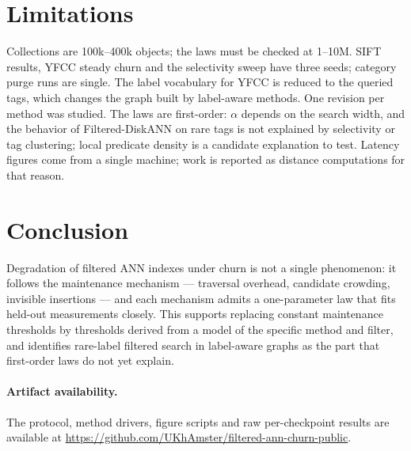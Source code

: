 \documentclass[10pt,a4paper]{article}
\begin{document}
\section{Limitations}

Collections are 100k--400k objects; the laws must be checked at 1--10M. SIFT results, YFCC steady churn and the selectivity sweep have three seeds; category purge runs are single. The label vocabulary for YFCC is reduced to the queried tags, which changes the graph built by label-aware methods. One revision per method was studied. The laws are first-order: $\alpha$ depends on the search width, and the behavior of Filtered-DiskANN on rare tags is not explained by selectivity or tag clustering; local predicate density \cite{staleness} is a candidate explanation to test. Latency figures come from a single machine; work is reported as distance computations for that reason.

\section{Conclusion}

Degradation of filtered ANN indexes under churn is not a single phenomenon: it follows the maintenance mechanism --- traversal overhead, candidate crowding, invisible insertions --- and each mechanism admits a one-parameter law that fits held-out measurements closely. This supports replacing constant maintenance thresholds by thresholds derived from a model of the specific method and filter, and identifies rare-label filtered search in label-aware graphs as the part that first-order laws do not yet explain.

\paragraph{Artifact availability.} The protocol, method drivers, figure scripts and raw per-checkpoint results are available at \url{https://github.com/UKhAmster/filtered-ann-churn-public}.
\end{document}
